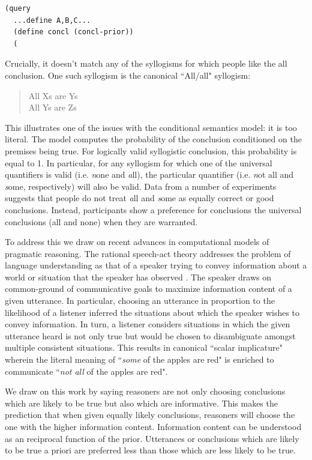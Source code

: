 \documentclass[10pt,letterpaper]{article}
\begin{document}
\begin{lstlisting}
(query
  ...define A,B,C...
  (define concl (concl-prior))
  (
\end{lstlisting}


 Crucially, it doesn't match any of the syllogisms for which people like the all conclusion. One such syllogism is the canonical ``All/all" syllogism:

\begin{quote}
All Xs are Ys \\
All Ys are Zs \\
\end{quote}

This illustrates one of the issues with the conditional semantics model: it is too literal. The model computes the probability of the conclusion conditioned on the premises being true. For logically valid syllogistic conclusion, this probability is equal to 1. In particular, for any syllogism for which one of the universal quantifiers is valid (i.e. {\emph none} and {\emph all}), the particular quantifier (i.e. {\emph not all} and {\emph some}, respectively) will also be valid. Data from a number of experiments suggests that people do not treat {\emph all} and {\emph some} as equally correct or good conclusions. Instead, participants show a preference for conclusions the universal conclusions (all and none) when they are warranted. 

To address this we draw on recent advances in computational models of pragmatic reasoning. The rational speech-act theory addresses the problem of language understanding as that of a speaker trying to convey information about a world or situation that the speaker has observed \cite{Frank2012a}. The speaker draws on common-ground of communicative goals to maximize information content of a given utterance. In particular, choosing an utterance in proportion to the likelihood of a listener inferred the situations about which the speaker wishes to convey information. In turn, a listener considers situations in which the given utterance heard is not only true but would be chosen to disambiguate amongst multiple consistent situations. This results in canonical ``scalar implicature" wherein the literal meaning of ``{\em some} of the apples are red" is enriched to communicate ``{\em not all} of the apples are red".

We draw on this work by saying reasoners are not only choosing conclusions which are likely to be true but also which are informative. This makes the prediction that when given equally likely conclusions, reasoners will choose the one with the higher information content. Information content can be understood as an reciprocal function of the prior. Utterances or conclusions which are likely to be true a priori are preferred less than those which are less likely to be true. 
\end{document}
